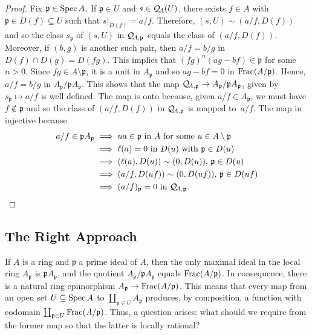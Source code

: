 \begin{proof}
    Fix $\mathfrak p\in\operatorname{Spec} A$. If $\mathfrak p\in U$ and $s\in\mathcal Q_{\!A}(U)$, there exists $f\in A$ with $\mathfrak p\in D(f)\subseteq U$ such that $s|_{D(f)}=a/f$. Therefore, $(s, U)\sim(a/f,D(f))$ and so the class $s_{\mathfrak p}$ of $(s,U)$ in $\mathcal Q_{\!A,\mathfrak p}$ equals the class of $(a/f,D(f))$. Moreover, if $(b,g)$ is another such pair, then $a/f=b/g$ in $D(f)\cap D(g)=D(fg)$. This implies that $(fg)^n(ag-bf)\in\mathfrak p$ for some $n>0$. Since $fg\in A\setminus\mathfrak p$, it is a unit in $A_{\mathfrak p}$ and so $ag-bf=0$ in $\operatorname{Frac}(A/\mathfrak p)$. Hence, $a/f=b/g$ in $A_{\mathfrak p}/\mathfrak pA_{\mathfrak p}$. This shows that the map $\mathcal Q_{\!A,\mathfrak p}\to A_{\mathfrak p}/\mathfrak pA_{\mathfrak p}$, given by $s_{\mathfrak p}\mapsto a/f$ is well defined. The map is onto because, given $a/f\in A_{\mathfrak p}$, we must have $f\notin\mathfrak p$ and so the class of $(a/f,D(f))$ in $\mathcal Q_{\!A,\mathfrak p}$ is mapped to~$a/f$. The map in injective because
    \begin{align*}
        a/f\in \mathfrak pA_{\mathfrak p}
            &\implies ua\in\mathfrak p\text{ in } A
                \text{ for some }u\in A\setminus\mathfrak p\\
            &\implies \ell(a) = 0 \text{ in }D(u)
                \text{ with }\mathfrak p\in D(u)\\
            &\implies (\ell(a), D(u)) \sim (0,D(u)),
                \,\mathfrak p\in D(u)\\
            &\implies (a/f, D(uf))\sim(0,D(uf)),
                \,\mathfrak p\in D(uf)\\
            &\implies (a/f)_{\mathfrak p}=0
                \text{ in }\mathcal Q_{\!A,\mathfrak p}.
    \end{align*}
\end{proof}

\subsection{The Right Approach}

If $A$ is a ring and $\mathfrak p$ a prime ideal of $A$, then the only maximal ideal in the local ring $A_{\mathfrak p}$ is $\mathfrak pA_{\mathfrak p}$, and the quotient $A_{\mathfrak p}/\mathfrak pA_{\mathfrak p}$ equals $\operatorname{Frac}(A/\mathfrak p)$. In consequence, there is a natural ring epimorphism $A_{\mathfrak p}\to\operatorname{Frac}(A/\mathfrak p)$. This means that every map from an open set $U\subseteq\operatorname{Spec} A$ to $\coprod_{\mathfrak p\in U}A_{\mathfrak p}$ produces, by composition, a function with codomain $\coprod_{\mathfrak p\in U}\operatorname{Frac}(A/\mathfrak p)$. Thus, a question arises: what should we require from the former map so that the latter is locally rational?

